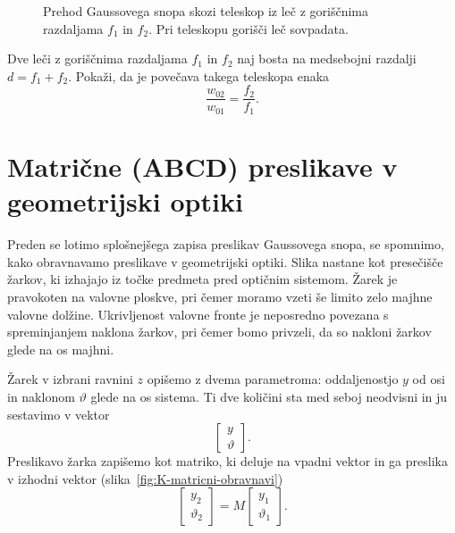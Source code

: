\begin{figure}[h]
\def\svgwidth{145truemm} 

\caption{Prehod Gaussovega snopa
skozi teleskop iz leč z goriščnima razdaljama $f_{1}$ in $f_{2}$. Pri teleskopu
gorišči leč sovpadata.}
\label{fig:Prehod-Gaussovega-snopa-teleskop}
\end{figure}

\begin{definition}
\label{teleskop}
Dve leči z goriščnima razdaljama $f_{1}$ in $f_{2}$ naj bosta na medsebojni
razdalji $d=f_{1}+f_{2}$. Pokaži, da je povečava takega teleskopa enaka  
\begin{equation}
\frac{w_{02}}{w_{01}}=\frac{f_{2}}{f_{1}}.
\label{eq:povecava-teleskop}
\end{equation}
\end{definition}

\section{Matrične (ABCD) preslikave v geometrijski optiki}

Preden se lotimo splošnejšega zapisa preslikav Gaussovega snopa, 
se spomnimo, kako obravnavamo preslikave v geometrijski optiki. 
Slika nastane kot presečišče žarkov,
ki izhajajo iz točke predmeta pred optičnim sistemom. Žarek 
je pravokoten na valovne ploskve, pri čemer moramo vzeti še limito zelo majhne
valovne dolžine. Ukrivljenost valovne fronte je neposredno
povezana s spreminjanjem naklona žarkov, pri čemer bomo privzeli, da so 
nakloni žarkov glede na os majhni.

Žarek v izbrani ravnini $z$ opišemo z dvema parametroma: 
oddaljenostjo $y$ od osi in naklonom $\vartheta$ glede na os sistema. Ti dve količini 
sta med seboj neodvisni in ju sestavimo 
v vektor
\begin{equation}
\left[\begin{array}{c}
y\\
\vartheta
\end{array}\right].
\end{equation}
Preslikavo žarka zapišemo kot matriko, ki deluje na vpadni vektor in ga preslika
v izhodni vektor (slika~\ref{fig:K-matricni-obravnavi})
\begin{equation}
\left[\begin{array}{c}
y_2\\
\vartheta_2
\end{array}\right] = M \left[\begin{array}{c}
y_1\\
\vartheta_1
\end{array}\right].
\end{equation}

